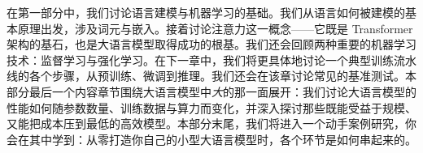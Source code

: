 在第一部分中，我们讨论语言建模与机器学习的基础。我们从语言如何被建模的基本原理出发，涉及词元与嵌入。接着讨论注意力这一概念——它既是 Transformer 架构的基石，也是大语言模型取得成功的根基。我们还会回顾两种重要的机器学习技术：监督学习与强化学习。在下一章中，我们将更具体地讨论一个典型训练流水线的各个步骤，从预训练、微调到推理。我们还会在该章讨论常见的基准测试。本部分最后一个内容章节围绕大语言模型中{\em 大}的那一面展开：我们讨论大语言模型的性能如何随参数数量、训练数据与算力而变化，并深入探讨那些既能受益于规模、又能把成本压到最低的高效模型。本部分末尾，我们将进入一个动手案例研究，你会在其中学到：从零打造你自己的小型大语言模型时，各个环节是如何串起来的。 
